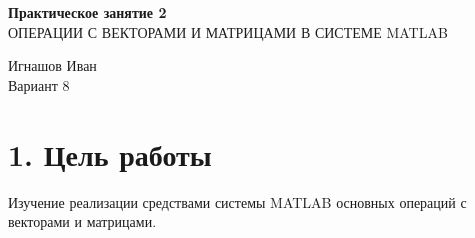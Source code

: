 \documentclass[12pt]{article}
\begin{document}
\begin{center}
	\LARGE 
	\textbf{Практическое занятие 2}\\
	ОПЕРАЦИИ С ВЕКТОРАМИ И МАТРИЦАМИ В СИСТЕМЕ MATLAB\\
\end{center}

\begin{flushright}
	\large
	Игнашов Иван\\
	Вариант 8\\
\end{flushright}

\newpage

 \section*{1. Цель работы}
Изучение реализации средствами системы MATLAB основных операций с векторами и матрицами.
\end{document}
